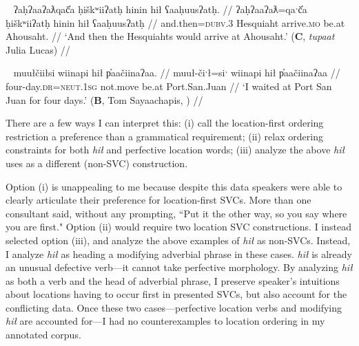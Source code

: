 \ex~ \label{ex:atahousaht2}
\begingl
\glpreamble ʔaḥʔaaʔaƛqač̓a ḥiškʷiiʔatḥ hinin hił ʕaaḥuusʔatḥ. //
\gla ʔaḥʔaaʔaƛ=qaˑč̓a ḥiškʷiiʔatḥ hinin hił ʕaaḥuusʔatḥ  //
\glb and.then=\textsc{dubv.3} Hesquiaht arrive.\textsc{mo} be.at Ahousaht. //
\glft `And then the Hesquiahts would arrive at Ahousaht.' (\textbf{C}, \textit{tupaat} Julia Lucas) //
\endgl
\xe 

\begin{comment}
\ex \label{ex:sleepinacanoe}
\begingl
\glpreamble weʔič̓aḥsʔaƛ k̓ʷalsic hił ʔanaḥʔis č̓apac ʔatḥii. //
\gla weʔič-!aḥs=!aƛ k̓ʷalsic hił ʔanaḥ=ʔis č̓apac ʔatḥii  //
\glb sleep.\textsc{dr}-in.a.vessel=\textsc{now} Kwalisits be.at size=\textsc{dim} canoe night. //
\glft `Kwalisits was sleeping in his little canoe through the night.' (\textbf{B}, Tom Sayaachapis, \cite[3]{sapir1924}) //
\endgl
\xe
\end{comment}

\ex~ \label{ex:waitatsanjuan}
\begingl
\glpreamble muułčiiłsi wiinapi hił p̓aačiinaʔaa. //
\gla muuł-čiˑł=siˑ wiinapi hił p̓aačiinaʔaa  //
\glb four-day.\textsc{dr}=\textsc{neut.1sg} not.move be.at Port.San.Juan //
\glft `I waited at Port San Juan for four days.' (\textbf{B}, Tom Sayaachapis, \cite[148]{sapir1939}) //
\endgl
\xe

There are a few ways I can interpret this: (i) call the location-first ordering restriction a preference than a grammatical requirement; (ii) relax ordering constraints for both \textit{hił} and perfective location words; (iii) analyze the above \textit{hił} uses as a different (non-SVC) construction.

Option (i) is unappealing to me because despite this data speakers were able to clearly articulate their preference for location-first SVCs. More than one consultant said, without any prompting, ``Put it the other way, so you say where you are first." Option (ii) would require two location SVC constructions. I instead selected option (iii), and analyze the above examples of \textit{hił} as non-SVCs. Instead, I analyze \textit{hił} as heading a modifying adverbial phrase in these cases. \textit{hił} is already an unusual defective verb---it cannot take perfective morphology. By analyzing \textit{hił} as both a verb and the head of adverbial phrase, I preserve speaker's intuitions about locations having to occur first in presented SVCs, but also account for the conflicting data. Once these two cases---perfective location verbs and modifying \textit{hił} are accounted for---I had no counterexamples to location ordering in my annotated corpus.

